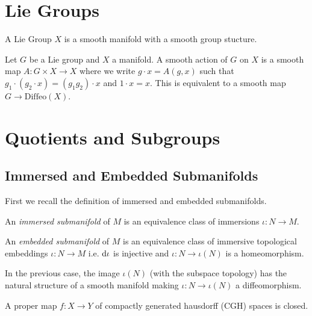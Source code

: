 \documentclass[12pt]{article}
\begin{document}
\section{Lie Groups} 

\begin{definition}
A Lie Group $X$ is a smooth manifold with a smooth group stucture.
\end{definition}

\begin{definition}
Let $G$ be a Lie group and $X$ a manifold. A smooth action of $G$ on $X$ is a smooth map $A : G \times X \to X$ where we write $g \cdot x = A(g, x)$ such that $g_1 \cdot (g_2 \cdot x) = (g_1 g_2) \cdot x$ and $1 \cdot x = x$. This is equivalent to a smooth map $G \to \mathrm{Diffeo}(X)$. 
\end{definition}


\section{Quotients and Subgroups}

\subsection{Immersed and Embedded Submanifolds}

\begin{rmk}
First we recall the definition of immersed and embedded submanifolds.
\end{rmk}

\begin{defn}
An \textit{immersed submanifold} of $M$ is an equivalence class of immersions $\iota : N \to M$. 
\end{defn}

\begin{defn}
An \textit{embedded submanifold} of $M$ is an equivalence class of immersive topological embeddings $\iota : N \to M$ i.e. $\mathrm{d}{\iota}$ is injective and $\iota : N \to \iota(N)$ is a homeomorphism. 
\end{defn}

\begin{rmk}
In the previous case, the image $\iota(N)$ (with the subspace topology) has the natural structure of a smooth manifold making $\iota : N \to \iota(N)$ a diffeomorphism.
\end{rmk}

\begin{lemma}
A proper map $f : X \to Y$ of compactly generated hausdorff (CGH) spaces is closed.
\end{lemma}
\end{document}
